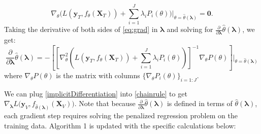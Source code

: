 \documentclass[10pt,letterpaper]{article}
\newcommand*{\vertbar}{\rule[-1ex]{0.5pt}{2.5ex}}
\begin{document}
\begin{equation}
\nabla_\theta \Big ( L(\boldsymbol{y}_T, f_\theta (\boldsymbol{X}_T)) + \sum\limits_{i=1}^J \lambda_i P_i(\theta) \Big ) \Big |_{\theta = \hat \theta(\boldsymbol{\lambda})} = \boldsymbol{0}.
\label{eq:grad}
\end{equation}
Taking the derivative of both sides of \eqref{eq:grad} in $\boldsymbol{\lambda}$ and solving for $\frac{\partial}{\partial \boldsymbol{\lambda}} \hat{\theta}(\boldsymbol{\lambda})$, we get:
\begin{equation}
\frac{\partial}{\partial \boldsymbol{\lambda}} \hat{\theta}(\boldsymbol{\lambda}) = 
- \left [ \left [
 \nabla_\theta^2 \left (  L(\boldsymbol{y}_T, f_\theta (\boldsymbol{X}_T))  +  \sum\limits_{i=1}^J \lambda_i P_i(\theta)  \right )  \right ]^{-1}
\nabla_\theta P(\theta)
\right ]
\bigg |_{\theta = \hat \theta(\boldsymbol{\lambda})}
\label{implicitDifferentiation}
\end{equation}
where $\nabla_\theta P(\theta)$ is the matrix with columns $\{\nabla_\theta P_i(\theta)\}_{i=1:J}$.

We can plug \eqref{implicitDifferentiation} into \eqref{chainrule} to get $\nabla_{\boldsymbol{\lambda}} L \Big( \boldsymbol{y}_V, f_{\hat{\theta}(\boldsymbol{\lambda})}(\boldsymbol{X}_V) \Big )$. Note that because $\frac{\partial}{\partial \boldsymbol{\lambda}} \hat{\theta}(\boldsymbol{\lambda})$ is defined in terms of $\hat{\theta}\left(\boldsymbol{\lambda}\right)$, each gradient step requires solving the penalized regression problem on the training data. Algorithm 1 is updated with the specific calculations below:
\end{document}
